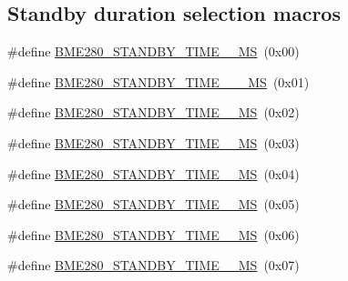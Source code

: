 \subsection*{Standby duration selection macros}
\begin{DoxyCompactItemize}
\item 
\#define \hyperlink{group___b_m_e280_ga96007052b64f48620c27a4b929d7b0c5}{B\+M\+E280\+\_\+\+S\+T\+A\+N\+D\+B\+Y\+\_\+\+T\+I\+M\+E\+\_\+\_\+\+MS}~(0x00)
\item 
\#define \hyperlink{group___b_m_e280_ga08d610ade362b9a865fc126189110f96}{B\+M\+E280\+\_\+\+S\+T\+A\+N\+D\+B\+Y\+\_\+\+T\+I\+M\+E\+\_\+\_\+\_\+\+MS}~(0x01)
\item 
\#define \hyperlink{group___b_m_e280_gabda2854c877d0ab552b0d3a5e92ce06a}{B\+M\+E280\+\_\+\+S\+T\+A\+N\+D\+B\+Y\+\_\+\+T\+I\+M\+E\+\_\+\_\+\+MS}~(0x02)
\item 
\#define \hyperlink{group___b_m_e280_ga3c7744e622d09172d4c6fe19d5060901}{B\+M\+E280\+\_\+\+S\+T\+A\+N\+D\+B\+Y\+\_\+\+T\+I\+M\+E\+\_\+\_\+\+MS}~(0x03)
\item 
\#define \hyperlink{group___b_m_e280_ga822d215c13193c2e88010c2c911a1e7c}{B\+M\+E280\+\_\+\+S\+T\+A\+N\+D\+B\+Y\+\_\+\+T\+I\+M\+E\+\_\+\_\+\+MS}~(0x04)
\item 
\#define \hyperlink{group___b_m_e280_gafe13ba4269e78b8a5b2463fbff88fdc9}{B\+M\+E280\+\_\+\+S\+T\+A\+N\+D\+B\+Y\+\_\+\+T\+I\+M\+E\+\_\+\_\+\+MS}~(0x05)
\item 
\#define \hyperlink{group___b_m_e280_ga2d9584d45556539af37055d1cee375df}{B\+M\+E280\+\_\+\+S\+T\+A\+N\+D\+B\+Y\+\_\+\+T\+I\+M\+E\+\_\+\_\+\+MS}~(0x06)
\item 
\#define \hyperlink{group___b_m_e280_gae9926694b90ad9154a2c849a7bceb7f6}{B\+M\+E280\+\_\+\+S\+T\+A\+N\+D\+B\+Y\+\_\+\+T\+I\+M\+E\+\_\+\_\+\+MS}~(0x07)
\end{DoxyCompactItemize}
